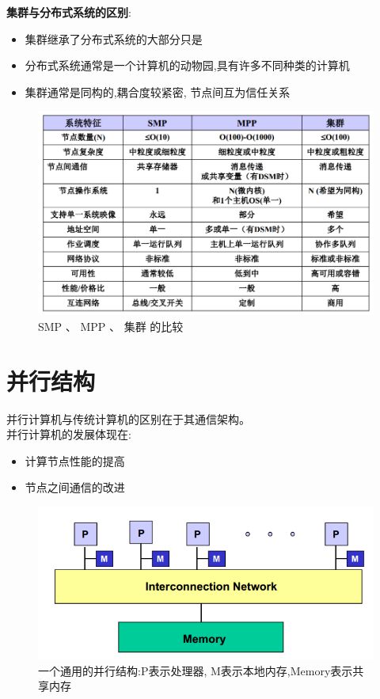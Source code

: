 \documentclass[UTF8,a4paper]{ctexart}
\begin{document}
  \textbf{集群与分布式系统的区别}:
  \begin{itemize}
    \item 集群继承了分布式系统的大部分只是
    \item 分布式系统通常是一个计算机的动物园,具有许多不同种类的计算机
    \item 集群通常是同构的,耦合度较紧密, 节点间互为信任关系
  \end{itemize}
  \begin{figure}[H]
    \centering
    \includegraphics[scale = 0.3]{assets/ParallelComputing_4c4bb.png}
    \caption{SMP 、 MPP 、 集群 的比较}
  \end{figure}

  \section{并行结构}
  并行计算机与传统计算机的区别在于其通信架构。\\
  并行计算机的发展体现在:
  \begin{itemize}
    \item 计算节点性能的提高
    \item 节点之间通信的改进
  \end{itemize}

  \begin{figure}[H]
    \centering
    \includegraphics[scale = 0.3]{assets/ParallelComputing_0293e.png}
    \caption{一个通用的并行结构:P表示处理器, M表示本地内存,Memory表示共享内存}
  \end{figure}
\end{document}
